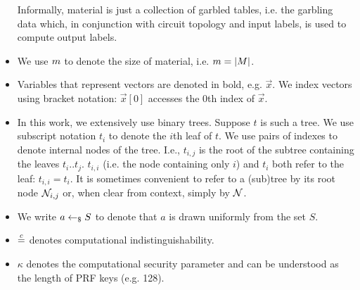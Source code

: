 \begin{itemize}
	Informally, material is just a collection of garbled tables, i.e. the garbling data which, in conjunction with circuit topology and input labels, is used to compute output labels.
\item We use $m$ to denote the size of material, i.e. $m =
  |M|$.
	\item Variables that represent vectors are denoted in bold, e.g.  $\vec{x}$.
	We index vectors using bracket notation: $\vec{x}[0]$ accesses the $0$th index of $\vec{x}$.
\item In this work, we extensively use binary trees.
  Suppose $t$ is such a tree. We use subscript notation $t_i$ to denote the
  $i$th leaf of $t$.
  We use pairs of indexes to denote internal nodes of the tree.
  I.e., $t_{i, j}$ is the root of the subtree containing the leaves
  $t_i .. t_j$. $t_{i,i}$ (i.e. the node
  containing only $i$) and $t_i$ both refer to the leaf: $t_{i,i} =
  t_i$.
  It is sometimes convenient to refer to a (sub)tree by its root node
  $\mathtt{\cal N}_{i, j}$ or, when clear from context, simply by $\mathtt{\cal N}$.
	\item We write $a \gets_{\$} S$ to denote that $a$ is drawn
    uniformly from the set $S$.
	\item $\overset{c}{=}$ denotes computational indistinguishability.
	\item $\kappa$ denotes the computational security parameter and can
    be understood as the length of PRF keys (e.g. 128).
\end{itemize}


